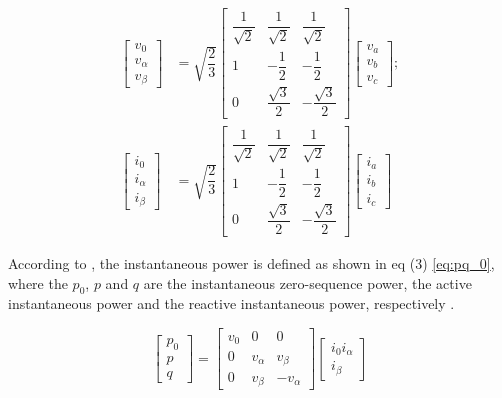 \begin{equation}
\begin{aligned}
\begin{bmatrix}
v_0\\
v_\alpha\\
v_\beta
\end{bmatrix}
& = \sqrt{\dfrac{2}{3}}
\begin{bmatrix}
\dfrac{1}{\sqrt{2}}	& \dfrac{1}{\sqrt{2}}	& \dfrac{1}{\sqrt{2}}		\\[2ex]
1					& -\dfrac{1}{2}			& -\dfrac{1}{2}				\\[2ex]
0					& \dfrac{\sqrt{3}}{2}	& -\dfrac{\sqrt{3}}{2}
\end{bmatrix}
\begin{bmatrix}
v_a\\
v_b\\
v_c
\end{bmatrix}
;\\
\begin{bmatrix}
i_0\\
i_\alpha\\
i_\beta
\end{bmatrix}
& = \sqrt{\dfrac{2}{3}}
\begin{bmatrix}
\dfrac{1}{\sqrt{2}}	& \dfrac{1}{\sqrt{2}}	& \dfrac{1}{\sqrt{2}}		\\[2ex]
1					& -\dfrac{1}{2}			& -\dfrac{1}{2}				\\[2ex]
0					& \dfrac{\sqrt{3}}{2}	& -\dfrac{\sqrt{3}}{2}
\end{bmatrix}
\begin{bmatrix}
i_a\\
i_b\\
i_c
\end{bmatrix}
\label{eq:Clarke}
\end{aligned}
\end{equation} 

According to \cite{Akagi}, the instantaneous power is defined as shown in eq (3) \ref{eq:pq_0}, where the $p_0$, $p$ and $q$ are the instantaneous zero-sequence power, the active instantaneous power and the reactive instantaneous power, respectively \cite{Akagi,Peng1996}.

\begin{equation}
\begin{bmatrix}
p_0\\
p\\
q
\end{bmatrix}=
\begin{bmatrix}
v_0		&	0			&	0\\
0		&	v_{\alpha}	&	v_{\beta}\\
0		&	v_{\beta}	&	-v_{\alpha}
\end{bmatrix}
\begin{bmatrix}
i_{0}
i_{\alpha}\\
i_{\beta}
\end{bmatrix}
\label{eq:pq_0}
\end{equation} 

